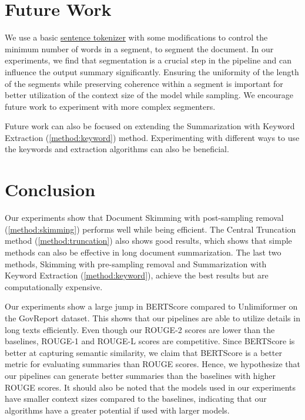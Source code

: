 \section{Future Work}
	\label{sec:future-work}

	We use a basic
	\href{https://www.nltk.org/api/nltk.tokenize.sent_tokenize.html}{sentence tokenizer}
	with some modifications to control the minimum number of words in a segment, to segment
	the document.
	In our experiments, we find that segmentation is a crucial step in the pipeline and can
	influence the output summary significantly.
	Ensuring the uniformity of the length of the segments while preserving coherence within a
	segment is important for better utilization of the context size of the model while sampling.
	We encourage future work to experiment with more complex segmenters.

	Future work can also be focused on extending the Summarization with Keyword Extraction
	(\ref{method:keyword}) method.
	Experimenting with different ways to use the keywords and extraction algorithms can also be
	beneficial.


\section{Conclusion}
\label{sec:conclusion}

	Our experiments show that Document Skimming with post-sampling removal (\ref{method:skimming})
	performs well while being efficient.
	The Central Truncation method (\ref{method:truncation}) also shows good results, which
	shows that simple methods can also be effective in long document summarization.
	The last two methods, Skimming with pre-sampling removal and Summarization with Keyword
	Extraction (\ref{method:keyword}), achieve the best results but are computationally expensive.

	Our experiments show a large jump in BERTScore compared to Unlimiformer on the GovReport
	dataset.
	This shows that our pipelines are able to utilize details in long texts efficiently.
	Even though our ROUGE-2 scores are lower than the baselines, ROUGE-1 and ROUGE-L scores are
	competitive.
	Since BERTScore is better at capturing semantic similarity, we claim that BERTScore is a
	better metric for evaluating summaries than ROUGE scores.
	Hence, we hypothesize that our pipelines can generate better summaries than the baselines
	with higher ROUGE scores.
	It should also be noted that the models used in our experiments have smaller context sizes
	compared to the baselines, indicating that our algorithms have a greater potential if
	used with larger models.


